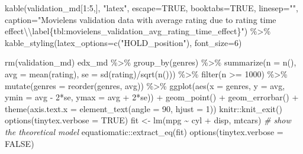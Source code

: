 \documentclass[
]{article}
\newenvironment{Shaded}{}{}
\newcommand{\AttributeTok}[1]{\textcolor[rgb]{0.49,0.56,0.16}{#1}}
\newcommand{\CommentTok}[1]{\textcolor[rgb]{0.38,0.63,0.69}{\textit{#1}}}
\newcommand{\ConstantTok}[1]{\textcolor[rgb]{0.53,0.00,0.00}{#1}}
\newcommand{\DecValTok}[1]{\textcolor[rgb]{0.25,0.63,0.44}{#1}}
\newcommand{\FunctionTok}[1]{\textcolor[rgb]{0.02,0.16,0.49}{#1}}
\newcommand{\NormalTok}[1]{#1}
\newcommand{\OtherTok}[1]{\textcolor[rgb]{0.00,0.44,0.13}{#1}}
\newcommand{\SpecialCharTok}[1]{\textcolor[rgb]{0.25,0.44,0.63}{#1}}
\newcommand{\StringTok}[1]{\textcolor[rgb]{0.25,0.44,0.63}{#1}}
\begin{document}
\begin{Shaded}
\begin{Highlighting}[]
\FunctionTok{kable}\NormalTok{(validation\_md[}\DecValTok{1}\SpecialCharTok{:}\DecValTok{5}\NormalTok{,], }\StringTok{"latex"}\NormalTok{, }\AttributeTok{escape=}\ConstantTok{TRUE}\NormalTok{, }\AttributeTok{booktabs=}\ConstantTok{TRUE}\NormalTok{, }\AttributeTok{linesep=}\StringTok{""}\NormalTok{, }\AttributeTok{caption=}\StringTok{"Movielens validation data with average rating due to rating time effect}\SpecialCharTok{\textbackslash{}\textbackslash{}}\StringTok{label\{tbl:movielens\_validation\_avg\_rating\_time\_effect\}"}\NormalTok{) }\SpecialCharTok{\%\textgreater{}\%}
    \FunctionTok{kable\_styling}\NormalTok{(}\AttributeTok{latex\_options=}\FunctionTok{c}\NormalTok{(}\StringTok{"HOLD\_position"}\NormalTok{), }\AttributeTok{font\_size=}\DecValTok{6}\NormalTok{)}

\FunctionTok{rm}\NormalTok{(validation\_md)}
\NormalTok{edx\_md }\SpecialCharTok{\%\textgreater{}\%} \FunctionTok{group\_by}\NormalTok{(genres) }\SpecialCharTok{\%\textgreater{}\%}
  \FunctionTok{summarize}\NormalTok{(}\AttributeTok{n =} \FunctionTok{n}\NormalTok{(), }\AttributeTok{avg =} \FunctionTok{mean}\NormalTok{(rating), }\AttributeTok{se =} \FunctionTok{sd}\NormalTok{(rating)}\SpecialCharTok{/}\FunctionTok{sqrt}\NormalTok{(}\FunctionTok{n}\NormalTok{())) }\SpecialCharTok{\%\textgreater{}\%}
  \FunctionTok{filter}\NormalTok{(n }\SpecialCharTok{\textgreater{}=} \DecValTok{1000}\NormalTok{) }\SpecialCharTok{\%\textgreater{}\%} 
  \FunctionTok{mutate}\NormalTok{(}\AttributeTok{genres =} \FunctionTok{reorder}\NormalTok{(genres, avg)) }\SpecialCharTok{\%\textgreater{}\%}
  \FunctionTok{ggplot}\NormalTok{(}\FunctionTok{aes}\NormalTok{(}\AttributeTok{x =}\NormalTok{ genres, }\AttributeTok{y =}\NormalTok{ avg, }\AttributeTok{ymin =}\NormalTok{ avg }\SpecialCharTok{{-}} \DecValTok{2}\SpecialCharTok{*}\NormalTok{se, }\AttributeTok{ymax =}\NormalTok{ avg }\SpecialCharTok{+} \DecValTok{2}\SpecialCharTok{*}\NormalTok{se)) }\SpecialCharTok{+} 
  \FunctionTok{geom\_point}\NormalTok{() }\SpecialCharTok{+}
  \FunctionTok{geom\_errorbar}\NormalTok{() }\SpecialCharTok{+} 
  \FunctionTok{theme}\NormalTok{(}\AttributeTok{axis.text.x =} \FunctionTok{element\_text}\NormalTok{(}\AttributeTok{angle =} \DecValTok{90}\NormalTok{, }\AttributeTok{hjust =} \DecValTok{1}\NormalTok{))}
\NormalTok{    knitr}\SpecialCharTok{::}\FunctionTok{knit\_exit}\NormalTok{()}
\FunctionTok{options}\NormalTok{(}\AttributeTok{tinytex.verbose =} \ConstantTok{TRUE}\NormalTok{)}
\NormalTok{fit }\OtherTok{\textless{}{-}} \FunctionTok{lm}\NormalTok{(mpg }\SpecialCharTok{\textasciitilde{}}\NormalTok{ cyl }\SpecialCharTok{+}\NormalTok{ disp, mtcars)}
\CommentTok{\# show the theoretical model}
\NormalTok{equatiomatic}\SpecialCharTok{::}\FunctionTok{extract\_eq}\NormalTok{(fit)}
\FunctionTok{options}\NormalTok{(}\AttributeTok{tinytex.verbose =} \ConstantTok{FALSE}\NormalTok{)}
\end{Highlighting}
\end{Shaded}
\end{document}
